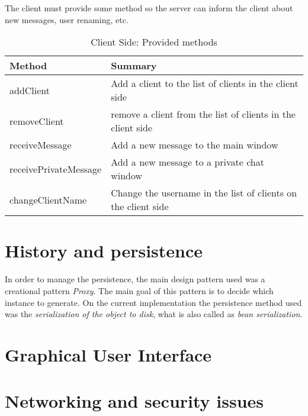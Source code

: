 \documentclass[8pt,a4paper]{article}
\begin{document}
The client must provide some method so the server can inform the client about new messages, user renaming, etc.  
  \begin{table}[H]
  \begin{center}
      \begin{tabular}{ | l | p{5cm} |}
      \hline
      Method & Summary \\ \hline
      addClient & Add a client to the list of clients in the client side \\ \hline 
      removeClient & remove a client from the list of clients in the client side \\ \hline
      receiveMessage & Add a new message to the main window \\ \hline
      receivePrivateMessage &  Add a new message to a private chat window \\ \hline
      changeClientName & Change the username in the list of clients on the client side \\ \hline
      \end{tabular}
  \end{center}
  \caption{Client Side: Provided methods}
  \label{tab:clientprovide}
  \end{table}

\section{History and persistence}

In order to manage the persistence, the main design pattern used was a creational pattern {\it Proxy}. The main goal of this pattern is to decide which instance to generate.
On the current implementation the persistence method used was the {\it serialization of the object to disk}, what is also called as {\it bean serialization}. 

\section{Graphical User Interface}
\section{Networking and security issues}
\end{document}
